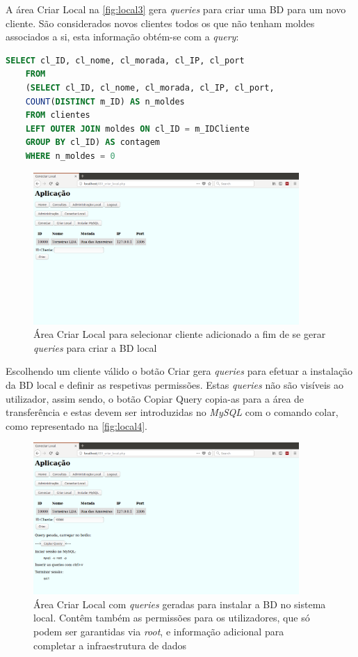 \documentclass[11pt,twoside,a4paper]{report}
\begin{document}
A área Criar Local na \autoref{fig:local3} gera \textit{queries} para criar uma BD para um novo cliente. São considerados novos clientes todos os que não tenham moldes associados a si, esta informação obtém-se com a \textit{query}:
\begin{lstlisting}[language = SQL]
	SELECT cl_ID, cl_nome, cl_morada, cl_IP, cl_port
	FROM
	(SELECT cl_ID, cl_nome, cl_morada, cl_IP, cl_port,
	COUNT(DISTINCT m_ID) AS n_moldes
	FROM clientes
	LEFT OUTER JOIN moldes ON cl_ID = m_IDCliente
	GROUP BY cl_ID) AS contagem
	WHERE n_moldes = 0
\end{lstlisting}
\begin{figure}[H]
	\centering
	\includegraphics[width=0.9\textwidth]{local02} %
	\caption[Área Criar Local]{Área Criar Local para selecionar cliente adicionado a fim de se gerar \textit{queries} para criar a BD local}
	\label{fig:local3}
\end{figure}
Escolhendo um cliente válido o botão Criar gera \textit{queries} para efetuar a instalação da BD local e definir as respetivas permissões. Estas \textit{queries} não são visíveis ao utilizador, assim sendo, o botão Copiar Query copia-as para a área de transferência e estas devem ser introduzidas no \textit{MySQL} com o comando colar, como representado na \autoref{fig:local4}.
\begin{figure}[H]
	\begin{center}
		\includegraphics[width=0.9\textwidth]{local03} %
		\caption[Área Criar Local com \textit{queries geradas}]{Área Criar Local com \textit{queries} geradas para instalar a BD no sistema local. Contêm também as permissões para os utilizadores, que só podem ser garantidas via \textit{root}, e informação adicional para completar a infraestrutura de dados}
		\label{fig:local4}
	\end{center}
\end{figure}
\end{document}

